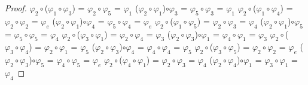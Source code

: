 \documentclass[10pt,a4paper,oneside]{article}
\begin{document}
\begin{proof}
					$\varphi_{2}\circ$($\varphi_{1}\circ\varphi_{3}$) = $\varphi_{2}\circ\varphi_{5}$ = $\varphi_{1}$
					\newline
					($\varphi_{2}\circ\varphi_{1}$)$\circ\varphi_{3}$ = $\varphi_{5}\circ\varphi_{3}$ = $\varphi_{1}$
					\newline
					\newline
					$\varphi_{2}\circ$($\varphi_{1}\circ\varphi_{4}$) = $\varphi_{2}\circ\varphi_{2}$ = $\varphi_{e}$
					\newline
					($\varphi_{2}\circ\varphi_{1}$)$\circ\varphi_{4}$ = $\varphi_{5}\circ\varphi_{4}$ = $\varphi_{e}$
					\newline
					\newline
					$\varphi_{2}\circ$($\varphi_{1}\circ\varphi_{5}$) = $\varphi_{2}\circ\varphi_{3}$ = $\varphi_{4}$
					\newline
					($\varphi_{2}\circ\varphi_{1}$)$\circ\varphi_{5}$ = $\varphi_{5}\circ\varphi_{5}$ = $\varphi_{4}$
					\newline
					\newline
					$\varphi_{2}\circ$($\varphi_{3}\circ\varphi_{1}$) = $\varphi_{2}\circ\varphi_{4}$ = $\varphi_{3}$
					\newline
					($\varphi_{2}\circ\varphi_{3}$)$\circ\varphi_{1}$ = $\varphi_{4}\circ\varphi_{1}$ = $\varphi_{3}$
					\newline
					\newline
					$\varphi_{2}\circ$($\varphi_{3}\circ\varphi_{4}$) = $\varphi_{2}\circ\varphi_{1}$ = $\varphi_{5}$
					\newline
					($\varphi_{2}\circ\varphi_{3}$)$\circ\varphi_{4}$ = $\varphi_{4}\circ\varphi_{4}$ = $\varphi_{5}$
					\newline
					\newline
					$\varphi_{2}\circ$($\varphi_{3}\circ\varphi_{5}$) = $\varphi_{2}\circ\varphi_{2}$ = $\varphi_{e}$
					\newline
					($\varphi_{2}\circ\varphi_{3}$)$\circ\varphi_{5}$ = $\varphi_{4}\circ\varphi_{5}$ = $\varphi_{e}$
					\newline
					\newline
					$\varphi_{2}\circ$($\varphi_{4}\circ\varphi_{1}$) = $\varphi_{2}\circ\varphi_{3}$ = $\varphi_{4}$
					\newline
					($\varphi_{2}\circ\varphi_{4}$)$\circ\varphi_{1}$ = $\varphi_{3}\circ\varphi_{1}$ = $\varphi_{4}$
					\newline
					\newline

\end{proof}
\end{document}
